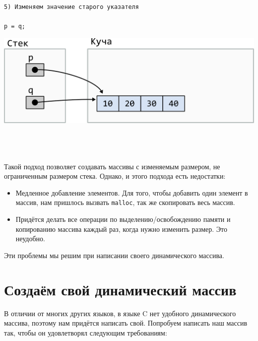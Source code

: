 \documentclass[10pt]{article}
\begin{document}
\noindent\begin{minipage}{.45\textwidth}
\begin{lstlisting}
5) Изменяем значение старого указателя

p = q;
\end{lstlisting}
\end{minipage}
\begin{minipage}{.45\textwidth}
\includegraphics[scale=0.75]{../images/malloc_realocation5.png}
\end{minipage}
\quad\\
\quad\\
\quad\\

Такой подход позволяет создавать массивы с изменяемым размером, не ограниченным размером стека.
Однако, и этого подхода есть недостатки:
\begin{itemize}
\item Медленное добавление элементов. Для того, чтобы добавить один элемент в массив, нам пришлось вызвать \texttt{malloc}, так же скопировать весь массив.
\item Придётся делать все операции по выделению/освобождению памяти и копированию массива каждый раз, когда нужно изменить размер. Это неудобно.
\end{itemize}
Эти проблемы мы решим при написании своего динамического массива.

\newpage
\section*{Создаём свой динамический массив}

В отличии от многих других языков, в языке C нет удобного динамического массива, поэтому нам придётся написать свой. Попробуем написать наш массив так, чтобы он удовлетворял следующим требованиям:
\end{document}
